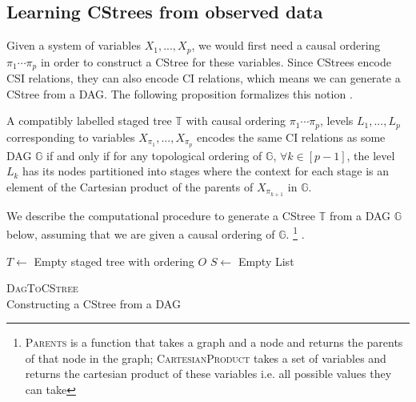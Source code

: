 \documentclass{tufte-book}
\begin{document}
\begin{Definition}
\section{Learning CStrees from observed data}
\label{sec:org6d2b262}
Given a system of variables \(X_1,...,X_p\), we would first need a causal ordering \(\pi_1 \cdots \pi_p\) in order to construct a CStree for these variables. Since CStrees encode CSI relations, they can also encode CI relations, which means we can generate a CStree from a DAG. The following proposition formalizes this notion \cite{duarte-2020-algeb}.

\begin{proposition}\label{prop:dagandcstree}
A compatibly labelled staged tree $\mathbb{T}$ with causal ordering $\pi_1 \cdots\pi_p$, levels $L_1,...,L_p$ corresponding to variables $X_{\pi_1},...,X_{\pi_p}$ encodes the same CI relations as some DAG $\mathbb{G}$ if and only if for any topological ordering of $\mathbb{G}$, $\forall k \in [p-1]$, the level $L_k$ has its nodes partitioned into stages where the context for each stage is an element of the Cartesian product of the parents of $X_{\pi_{k+1}}$ in $\mathbb{G}$.
\end{proposition}

We describe the computational procedure to generate a CStree \(\mathbb{T}\) from a DAG \(\mathbb{G}\) below, assuming that we are given a causal ordering of \(\mathbb{G}\).  \footnote{\textsc{Parents} is a function that takes a graph and a node and returns the parents of that node in the graph; \textsc{CartesianProduct} takes a set of variables and returns the cartesian product of these variables i.e. all possible values they can take} .



\begin{algorithm}[H]
\label{alg:dagtocstree}
      \SetAlgoLined
      $T \gets$ Empty staged tree with ordering $O$\;
      $S \gets$ Empty List\;
       \caption{\textsc{DagToCStree}\\Constructing a CStree from a DAG}
      \end{algorithm}


\end{Definition}
\end{document}
